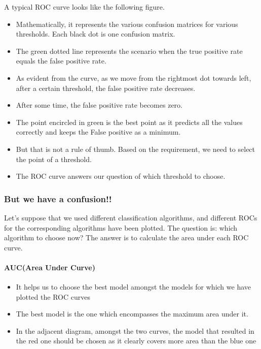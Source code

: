 \documentclass[11pt]{article}
\providecommand{\tightlist}{%
      \setlength{\itemsep}{0pt}\setlength{\parskip}{0pt}}
\begin{document}
    A typical ROC curve looks like the following figure.

\begin{itemize}
\tightlist
\item
  Mathematically, it represents the various confusion matrices for
  various thresholds. Each black dot is one confusion matrix.
\item
  The green dotted line represents the scenario when the true positive
  rate equals the false positive rate.
\item
  As evident from the curve, as we move from the rightmost dot towards
  left, after a certain threshold, the false positive rate decreases.
\item
  After some time, the false positive rate becomes zero.
\item
  The point encircled in green is the best point as it predicts all the
  values correctly and keeps the False positive as a minimum.
\item
  But that is not a rule of thumb. Based on the requirement, we need to
  select the point of a threshold.
\item
  The ROC curve answers our question of which threshold to choose.
\end{itemize}

    \subsubsection{But we have a confusion!!}\label{but-we-have-a-confusion}

Let's suppose that we used different classification algorithms, and
different ROCs for the corresponding algorithms have been plotted. The
question is: which algorithm to choose now? The answer is to calculate
the area under each ROC curve.

    \paragraph{AUC(Area Under Curve)}\label{aucarea-under-curve}

\begin{itemize}
\tightlist
\item
  It helps us to choose the best model amongst the models for which we
  have plotted the ROC curves
\item
  The best model is the one which encompasses the maximum area under it.
\item
  In the adjacent diagram, amongst the two curves, the model that
  resulted in the red one should be chosen as it clearly covers more
  area than the blue one
\end{itemize}
\end{document}
